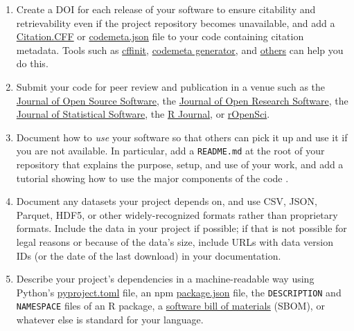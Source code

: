 \documentclass[10pt,letterpaper]{article}
\begin{document}
\begin{enumerate}

\item
  Create a DOI for each release of your software
  to ensure citability and retrievability even if the project repository becomes unavailable,
  and add a \href{https://citation-file-format.github.io/}{Citation.CFF}
  or \href{https://codemeta.github.io}{codemeta.json} file to your code \cite{Druskat2021}
  containing citation metadata.
  Tools such as \href{https://citation-file-format.github.io/cff-initializer-javascript/}{cffinit},
  \href{https://codemeta.github.io/codemeta-generator/}{codemeta generator},
  and \href{https://github.com/citation-file-format/citation-file-format/blob/main/README.md\#tools-to-work-with-citationcff-files-wrench}{others}
  can help you do this.

\item
  Submit your code for peer review and publication in a venue such as
  the \href{https://joss.theoj.org/}{Journal of Open Source Software},
  the \href{https://openresearchsoftware.metajnl.com/}{Journal of Open Research Software},
  the \href{http://www.jstatsoft.org}{Journal of Statistical Software},
  the \href{https://journal.r-project.org/}{R Journal},
  or \href{https://ropensci.org/}{rOpenSci}.

\item
  Document how to \emph{use} your software so that others can pick it up and use it if you are not available.
  In particular,
  add a \texttt{README.md} at the root of your repository
  that explains the purpose, setup, and use of your work,
  and add a tutorial showing how to use the major components of the code
  \cite{Lee2018b,Huybrechts2024,Littauer2025,Katz2025,Turing2025}.

\item
  Document any datasets your project depends on,
  and use CSV, JSON, Parquet, HDF5, or other widely-recognized formats rather than proprietary formats.
  Include the data in your project if possible;
  if that is not possible for legal reasons or because of the data's size,
  include URLs with data version IDs (or the date of the last download) in your documentation.

\item
  Describe your project's dependencies in a machine-readable way
  using Python's \href{https://packaging.python.org/en/latest/guides/writing-pyproject-toml/}{pyproject.toml} file,
  an npm \href{https://docs.npmjs.com/cli/v10/configuring-npm/package-json?v=true}{package.json} file,
  the \texttt{DESCRIPTION} and \texttt{NAMESPACE} files of an R package,
  a \href{https://openssf.org/technical-initiatives/sbom-tools/}{software bill of materials} (SBOM),
  or whatever else is standard for your language.


\end{enumerate}
\end{document}
